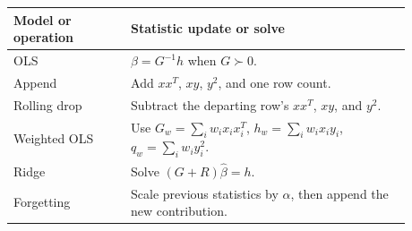 \documentclass[11pt]{article}
\begin{document}
\begin{center}
\begin{tabular}{>{\raggedright\arraybackslash}p{0.26\linewidth}
                >{\raggedright\arraybackslash}p{0.62\linewidth}}
\hline
Model or operation & Statistic update or solve \\
\hline
OLS & \(\widehat{\beta}=G^{-1}h\) when \(G\succ 0\). \\
Append & Add \(xx^T\), \(xy\), \(y^2\), and one row count. \\
Rolling drop & Subtract the departing row's \(xx^T\), \(xy\), and
\(y^2\). \\
Weighted OLS & Use \(G_w=\sum_i w_i x_i x_i^T\),
\(h_w=\sum_i w_i x_i y_i\), \(q_w=\sum_i w_i y_i^2\). \\
Ridge & Solve \((G+R)\widehat{\beta}=h\). \\
Forgetting & Scale previous statistics by \(\alpha\), then append the
new contribution. \\
\hline
\end{tabular}
\end{center}
\end{document}
